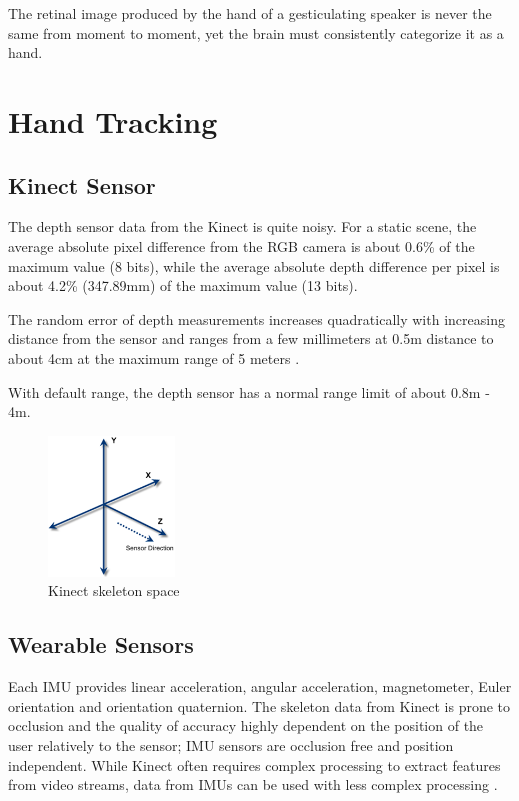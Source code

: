 \begin{savequote}
The retinal image produced by the hand of a gesticulating
speaker is never the same from moment to moment, yet the brain must consistently categorize
it as a hand. 
\end{savequote}
\chapter{Hand Tracking}

\section{Kinect Sensor}
The depth sensor data from the Kinect is quite noisy. For a static scene, the
average absolute pixel difference from the RGB camera is about 0.6\% of the maximum value (8
bits), while the average absolute depth difference per pixel is about 4.2\%
(347.89mm) of the maximum value (13 bits).

The random error of depth measurements increases quadratically with increasing distance from the 
sensor and ranges from a few millimeters at 0.5m distance to about 4cm
at the maximum range of 5 meters \cite{khoshelham2011}.

With default range, the depth sensor has a normal range limit of about 0.8m -
4m.

\begin{figure}[tbh]
\centering
\includegraphics[width=0.3\textwidth]{figures/skeleton_space.png}
\caption{Kinect skeleton
space~\cite{kinect-space-14}}
\label{}
\end{figure}

\section{Wearable Sensors}
Each IMU provides linear acceleration, angular acceleration, magnetometer, Euler
orientation and orientation quaternion. The skeleton data from Kinect is prone
to occlusion and the quality of accuracy highly dependent on the position of the
user relatively to the sensor; IMU sensors are occlusion free and position
independent. While Kinect often requires complex processing to extract features
from video streams, data from IMUs can be used with less complex processing
\cite{Ruffieux2013}.

